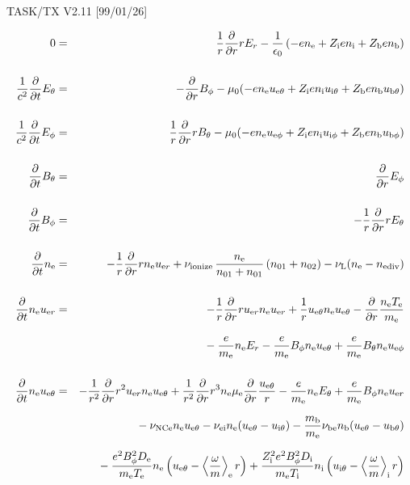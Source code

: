 \documentclass[11pt]{article}
\def\r#1{{\rm#1}}
\def\ddt{\frac{\partial}{\partial t}}
\def\ddr{\frac{\partial}{\partial r}}
\def\ave#1{\left\langle#1\right\rangle}
\def\me{m_\r{e}}
\def\mb{m_\r{b}}
\def\mue{\mu_\r{e}}
\def\De{D_\r{e}}
\def\Di{D_\r{i}}
\def\ne{n_\r{e}}
\def\ni{n_\r{i}}
\def\nb{n_\r{b}}
\def\uer{u_{\r{e}r}}
\def\ueth{u_{\r{e}\theta}}
\def\uith{u_{\r{i}\theta}}
\def\ubth{u_{\r{b}\theta}}
\def\ueph{u_{\r{e}\phi}}
\def\uiph{u_{\r{i}\phi}}
\def\ubph{u_{\r{b}\phi}}
\def\Er{E_r}
\def\Eth{E_\theta}
\def\Eph{E_\phi}
\def\Bth{B_\theta}
\def\Bph{B_\phi}
\def\Te{T_\r{e}}
\def\Ti{T_\r{i}}
\def\nna{n_{01}}
\def\nnb{n_{02}}
\def\Zi{Z_\r{i}}
\def\Zb{Z_\r{b}}
\def\nuNCe{\nu_\r{NCe}}
\def\nuL{\nu_\r{L}}
\def\nuion{\nu_\r{ionize}}
\def\nediv{n_\r{ediv}}
\newcommand{\Frac}[2]{%
  {\displaystyle {\displaystyle #1\over \displaystyle #2}}%
}
\newcommand{\rdprd}[2]{\Frac{\partial #1}{\partial #2}}
\newcommand{\aveaveB}[1]{\left< \!\! \left< #1 \right> \!\! \right>}
\begin{document}
\begin{center}
TASK/TX V2.11 [99/01/26]
\end{center}
\begin{eqnarray}
%
%
  0 &=&
%
  \frac{1}{r} \ddr r \Er
%
 - \frac{1}{\epsilon_0}
  \left(-e \ne + \Zi e \ni + \Zb e \nb \right)
\\[5mm]
%
%
  \frac{1}{c^2} \ddt \Eth &=&
%
  - \ddr \Bph
%
  - \mu_0 (-e \ne \ueth + \Zi e \ni \uith + \Zb e \nb \ubth)
\\[5mm]
%
%
  \frac{1}{c^2} \ddt \Eph &=&
%
  \frac{1}{r} \ddr r \Bth
%
  - \mu_0 (-e \ne \ueph + \Zi e \ni \uiph + \Zb e \nb \ubph)
\\[5mm]
%
%
  \ddt \Bth &=&
%
  \ddr \Eph
\\[5mm]
%
%
  \ddt \Bph &=&
%
  - \frac{1}{r} \ddr r \Eth
\\[5mm]
%
%
  \ddt\ne &=&
%
  - \frac{1}{r} \ddr r \ne \uer 
%
  + \nuion\, \frac{\ne}{\nna+\nna}\, (\nna+\nnb)
%
  - \nuL (\ne - \nediv)
\\[5mm]
%
%
  \ddt \ne \uer &=&
%
  - \frac{1}{r} \ddr r \uer \ne \uer
%
  + \frac{1}{r} \ueth \ne \ueth
%
  - \ddr \frac{\ne \Te}{\me}
\nonumber\\[3mm]&&{}
%
  - \frac{e}{\me} \ne \Er
%
  - \frac{e}{\me} \Bph \ne \ueth
%
  + \frac{e}{\me} \Bth \ne \ueph
\\[5mm]
%
%
  \ddt \ne \ueth &=&
%
  - \frac{1}{r^2} \ddr r^2 \uer \ne \ueth
%
  + \frac{1}{r^2} \ddr r^3 \ne \mue \ddr \frac{\ueth}{r}
%
  - \frac{e}{\me} \ne \Eth
%
  + \frac{e}{\me} \Bph \ne \uer
\nonumber\\[2.5mm]&&{}
%
  - \nuNCe \ne \ueth
%
  - \nu_\r{ei} \ne (\ueth - \uith)
%
  - \frac{\mb}{\me} \nu_\r{be} \nb (\ueth - \ubth)
\nonumber\\[2.5mm]&&{}
%
  - \frac{e^2 \Bph^2 \De}{\me\Te}\ne
    \left(\ueth - \ave{\frac{\omega}{m}}_\r{e} r \right)
%
   + \frac{\Zi^2 e^2 \Bph^2 \Di}{\me\Ti}\ni
    \left(\uith - \ave{\frac{\omega}{m}}_\r{i} r \right)
\nonumber\\[2.5mm]&&{}
%

\end{eqnarray}
\end{document}
